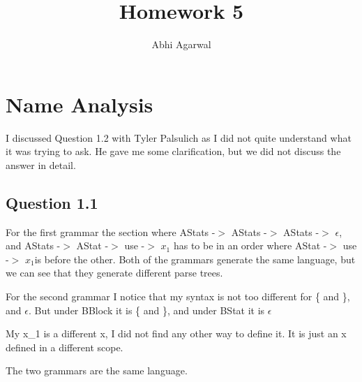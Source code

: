 \documentclass[11pt, oneside]{article}   	%
\title{Homework 5}
\author{Abhi Agarwal}
\date{}							%
\begin{document}
\maketitle
\section{Name Analysis}

\par I discussed Question 1.2 with Tyler Palsulich as I did not quite understand what it was trying to ask. He gave me some clarification, but we did not discuss the answer in detail.

\subsection{Question 1.1}

\par For the first grammar the section where AStats -$>$ AStats -$>$ AStats -$>$ $\epsilon$, and AStats -$>$ AStat -$>$ use -$>$ $x_1$ has to be in an order where AStat -$>$ use -$>$ $x_1$is before the other. Both of the grammars generate the same language, but we can see that they generate different parse trees. 
\par For the second grammar I notice that my syntax is not too different for \{ and \}, and $\epsilon$. But under BBlock it is \{ and \}, and under BStat it is $\epsilon$
\par My x\_1 is a different x, I did not find any other way to define it. It is just an x defined in a different scope.
\par The two grammars are the same language.
\end{document}
